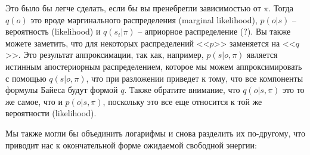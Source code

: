 \documentclass[12pt]{article}
\begin{document}
\begin{figure}[h]
\end{figure}

Это было бы легче сделать, если бы вы пренебрегли зависимостью от $\pi$. Тогда $q(o)$ это вроде маргинального распределения (marginal likelihood), $p(o|s)$ -- вероятность (likelihood) и $q(s_t|\pi)$ -- априорное распределение (?). Вы также можете заметить, что для некоторых распределений <<$p$>> заменяется на <<$q$>>. Это результат аппроксимации, так как, например, $p(s|o,\pi)$ является истинным апостериорным распределением, которое мы можем аппроксимировать с помощью $q(s|o,\pi)$, что при разложении приведет к тому, что все компоненты формулы Байеса будут формой $q$. Также обратите внимание, что $q(o|s,\pi)$ это то же самое, что и $p(o|s,\pi)$, поскольку это все еще относится к той же вероятности (likelihood).


Мы также могли бы объединить логарифмы и снова разделить их по-другому, что приводит нас к окончательной форме ожидаемой свободной энергии:


\begin{figure}[h]
\end{figure}
\end{document}
